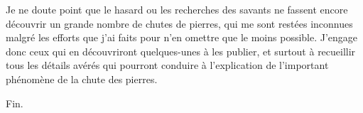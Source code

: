 \documentclass[a4paper, 12pt, oneside, french]{article}
\begin{document}
Je ne doute point que le hasard ou les recherches des savants ne fassent encore découvrir un grande nombre de chutes de pierres, qui me sont restées inconnues malgré les efforts que j'ai faits pour n'en omettre que le moins possible. J'engage donc ceux qui en découvriront quelques-unes à les publier, et surtout à recueillir tous les détails avérés qui pourront conduire à l'explication de l'important phénomène de la chute des pierres.

\bigskip

\begin{center}
Fin.
\end{center}
\clearpage
\end{document}
